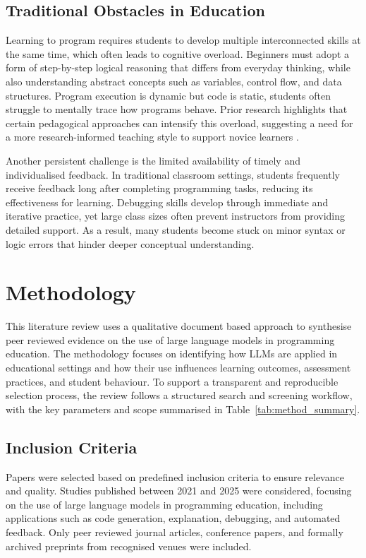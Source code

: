 \documentclass[10pt,journal,compsoc]{IEEEtran}
\begin{document}
\subsection{Traditional Obstacles in Education}
Learning to program requires students to develop multiple interconnected skills at the same time, which often leads to cognitive overload. Beginners must adopt a form of step-by-step logical reasoning that differs from everyday thinking, while also understanding abstract concepts such as variables, control flow, and data structures. Program execution is dynamic but code is static, students often struggle to mentally trace how programs behave. Prior research highlights that certain pedagogical approaches can intensify this overload, suggesting a need for a more research-informed teaching style to support novice learners \cite{Cardell-Oliver2014}.

Another persistent challenge is the limited availability of timely and individualised feedback. In traditional classroom settings, students frequently receive feedback long after completing programming tasks, reducing its effectiveness for learning. Debugging skills develop through immediate and iterative practice, yet large class sizes often prevent instructors from providing detailed support. As a result, many students become stuck on minor syntax or logic errors that hinder deeper conceptual understanding.

\section{Methodology}
\label{sec: methodology}

This literature review uses a qualitative document based approach to synthesise peer reviewed evidence on the use of large language models in programming education. The methodology focuses on identifying how LLMs are applied in educational settings and how their use influences learning outcomes, assessment practices, and student behaviour. To support a transparent and reproducible selection process, the review follows a structured search and screening workflow, with the key parameters and scope summarised in Table~\ref{tab:method_summary}.

\subsection{Inclusion Criteria}
Papers were selected based on predefined inclusion criteria to ensure relevance and quality. Studies published between 2021 and 2025 were considered, focusing on the use of large language models in programming education, including applications such as code generation, explanation, debugging, and automated feedback. Only peer reviewed journal articles, conference papers, and formally archived preprints from recognised venues were included.
\end{document}
